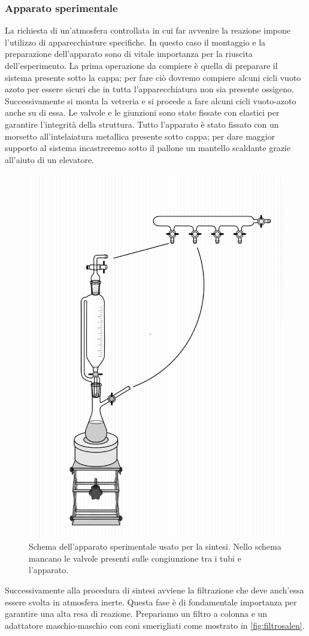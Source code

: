 \subsubsection{Apparato sperimentale}
\label{sec:cosalenapp}
La richiesta di un'atmosfera controllata in cui far avvenire la reazione impone l'utilizzo di apparecchiature specifiche. In questo caso il montaggio e la preparazione dell'apparato sono di vitale importanza per la riuscita dell'esperimento. La prima operazione da compiere è quella di preparare il sistema presente sotto la cappa; per fare ciò dovremo compiere alcuni cicli vuoto azoto per essere sicuri che in tutta l'apparecchiatura non sia presente ossigeno. Successivamente si monta la vetreria e si procede a fare alcuni cicli vuoto-azoto anche su di essa. Le valvole e le giunzioni sono state fissate con elastici per garantire l'integrità della struttura. Tutto l'apparato è stato fissato con un morsetto all'intelaiatura metallica presente sotto cappa; per dare maggior supporto al sistema incastreremo sotto il pallone un mantello scaldante grazie all'aiuto di un elevatore.
\begin{figure}[h!]
    \centering
    \includegraphics[width=0.4\linewidth]{foto/apparatosalen.png}
    \caption{Schema dell'apparato sperimentale usato per la sintesi. Nello schema mancano le valvole presenti sulle congiunzione tra i tubi e l'apparato. }
    \label{fig:my_label}
\end{figure}
Successivamente alla procedura di sintesi avviene la filtrazione che deve anch'essa essere svolta in atmosfera inerte. Questa fase è di fondamentale importanza per garantire una alta resa di reazione. Prepariamo un filtro a colonna e un adattatore maschio-maschio con coni smerigliati come mostrato in \autoref{fig:filtrosalen}. 
